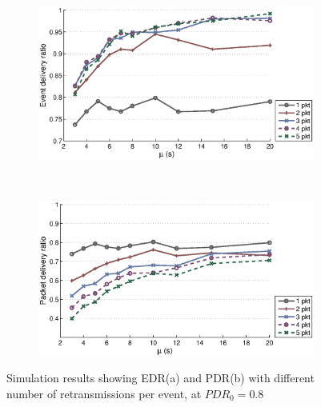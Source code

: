 \begin{figure}[p]
    \centering
    \begin{subfigure}[t]{0.9\textwidth}
        \centering
        \includegraphics[width=\textwidth] {../../sw/pc/matlab/simulation-result/retrans-count-edr-20min-pdr0.8.eps}
        \caption{}
    \end{subfigure} 
    \\
    \begin{subfigure}[t]{0.9\textwidth}
        \centering
        \includegraphics[width=\textwidth] {../../sw/pc/matlab/simulation-result/retrans-count-pdr-20min-pdr0.8.eps}
        \caption{}
    \end{subfigure}
    \caption[EDR and PDR with different transmission redundancy, $PDR_0 = 0.8$]{Simulation results showing EDR(a) and PDR(b) with different number of retransmissions per event, at $PDR_0 = 0.8$}\label{fig:retrans-lambda-0.8}
\end{figure}


